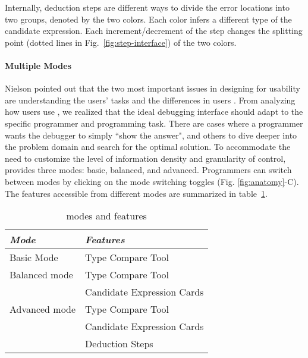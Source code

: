 Internally, deduction steps are different ways to divide the error locations into two  groups, denoted by the two colors. Each color infers a different type of the candidate expression. Each increment/decrement of the step changes the splitting point (dotted lines in Fig.~\ref{fig:step-interface}) of the two colors.


\paragraph{Multiple Modes}

Nielson pointed out  that the two most important issues in designing for usability are understanding the users' tasks and the differences in users \cite{Jakob_Nielsen1994-gd}. From analyzing how users use \chameleon{}, we realized that the ideal debugging interface should adapt to the specific programmer and programming task. There are cases where a programmer wants the debugger to simply ``show the answer", and others to dive deeper into the problem domain and search for the optimal solution. To accommodate the need to customize the level of information density and granularity of control, \chameleon{} provides three modes: basic, balanced, and advanced. Programmers can switch between modes by clicking on the mode switching toggles (Fig. \ref{fig:anatomy}-C). The features accessible from different modes are summarized in table~\ref{tab:chameleon-features}.%

\begin{table}
    \centering
\begin{scriptsize}
\begin{center}

    \begin{tabular}{ l l  }
     \textit{Mode} & \textit{Features} \\ \hline
     Basic Mode & Type Compare Tool \\ \hline
     Balanced mode & Type Compare Tool \\
     & Candidate Expression Cards \\  \hline
     Advanced mode & Type Compare Tool \\
     & Candidate Expression Cards \\
     & Deduction Steps \\
    \end{tabular}
    \end{center}
\end{scriptsize}
    \caption{\chameleon{} modes and features}
    \label {tab:chameleon-features}
\end{table}


